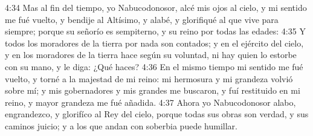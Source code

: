 4:34 Mas al fin del tiempo, yo Nabucodonosor, alcé mis ojos al cielo, y mi sentido me fué vuelto, y bendije al Altísimo, y alabé, y glorifiqué al que vive para siempre; porque su señorío es sempiterno, y su reino por todas las edades:
4:35 Y todos los moradores de la tierra por nada son contados; y en el ejército del cielo, y en los moradores de la tierra hace según su voluntad, ni hay quien lo estorbe con su mano, y le diga: ¿Qué haces?
4:36 En el mismo tiempo mi sentido me fué vuelto, y torné a la majestad de mi reino: mi hermosura y mi grandeza volvió sobre mí; y mis gobernadores y mis grandes me buscaron, y fuí restituido en mi reino, y mayor grandeza me fué añadida.
4:37 Ahora yo Nabucodonosor alabo, engrandezco, y glorifíco al Rey del cielo, porque todas sus obras son verdad, y sus caminos juicio; y a los que andan con soberbia puede humillar.
